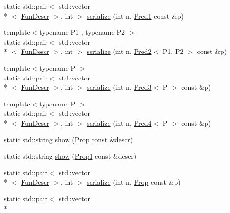 \begin{DoxyCompactItemize}
\item 
static std\-::pair$<$ std\-::vector\\*
$<$ \hyperlink{structpfq__lang_1_1FunDescr}{Fun\-Descr} $>$, int $>$ \hyperlink{namespacepfq__lang_1_1term_aa703deb6d0471f1cda2bd309efb365c2}{serialize} (int n, \hyperlink{structpfq__lang_1_1term_1_1Pred1}{Pred1} const \&p)
\item 
{\footnotesize template$<$typename P1 , typename P2 $>$ }\\static std\-::pair$<$ std\-::vector\\*
$<$ \hyperlink{structpfq__lang_1_1FunDescr}{Fun\-Descr} $>$, int $>$ \hyperlink{namespacepfq__lang_1_1term_aaf3db3c975c62725003d581938f6e64a}{serialize} (int n, \hyperlink{structpfq__lang_1_1term_1_1Pred2}{Pred2}$<$ P1, P2 $>$ const \&p)
\item 
{\footnotesize template$<$typename P $>$ }\\static std\-::pair$<$ std\-::vector\\*
$<$ \hyperlink{structpfq__lang_1_1FunDescr}{Fun\-Descr} $>$, int $>$ \hyperlink{namespacepfq__lang_1_1term_a26dba32cd30fad7f83a4f9465810efd8}{serialize} (int n, \hyperlink{structpfq__lang_1_1term_1_1Pred3}{Pred3}$<$ P $>$ const \&p)
\item 
{\footnotesize template$<$typename P $>$ }\\static std\-::pair$<$ std\-::vector\\*
$<$ \hyperlink{structpfq__lang_1_1FunDescr}{Fun\-Descr} $>$, int $>$ \hyperlink{namespacepfq__lang_1_1term_a5b52555849e2427abd36e4b9d8db801b}{serialize} (int n, \hyperlink{structpfq__lang_1_1term_1_1Pred4}{Pred4}$<$ P $>$ const \&p)
\item 
static std\-::string \hyperlink{namespacepfq__lang_1_1term_a1472dcec0cb7179ecef930ad1af58abd}{show} (\hyperlink{structpfq__lang_1_1term_1_1Prop}{Prop} const \&descr)
\item 
static std\-::string \hyperlink{namespacepfq__lang_1_1term_afe3683cc62dc9cc9b7c3212f8dd29629}{show} (\hyperlink{structpfq__lang_1_1term_1_1Prop1}{Prop1} const \&descr)
\item 
static std\-::pair$<$ std\-::vector\\*
$<$ \hyperlink{structpfq__lang_1_1FunDescr}{Fun\-Descr} $>$, int $>$ \hyperlink{namespacepfq__lang_1_1term_adcc56fe8e5962c2f8993255030fdf03f}{serialize} (int n, \hyperlink{structpfq__lang_1_1term_1_1Prop}{Prop} const \&p)
\item 
static std\-::pair$<$ std\-::vector\\*

\end{DoxyCompactItemize}
